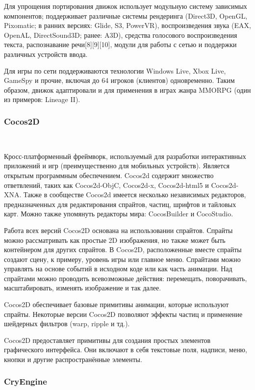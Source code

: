 Для упрощения портирования движок использует модульную систему зависимых компонентов; поддерживает различные системы рендеринга (Direct3D, OpenGL, Pixomatic; в ранних версиях: Glide, S3, PowerVR), воспроизведения звука (EAX, OpenAL, DirectSound3D; ранее: A3D), средства голосового воспроизведения текста, распознавание речи[8][9][10], модули для работы с сетью и поддержки различных устройств ввода.

Для игры по сети поддерживаются технологии Windows Live, Xbox Live, GameSpy и прочие, включая до 64 игроков (клиентов) одновременно. Таким образом, движок адаптировали и для применения в играх жанра MMORPG (один из примеров: Lineage II).

\subsubsection{Cocos2D}~
\label{sub:domain:subsec_game_engines:cocos}

Кросс-платформенный фреймворк, используемый для разработки интерактивных приложений и игр (преимущественно для мобильных устройств). Является открытым программным обеспечением. Cocos2d содержит множество ответвлений, таких как Cocos2d-ObjC, Cocos2d-x, Cocos2d-html5 и Cocos2d-XNA. Также в сообществе Cocos2d имеется несколько независимых редакторов, предназначенных для редактирования спрайтов, частиц, шрифтов и тайловых карт. Можно также упомянуть редакторы мира: CocosBuilder и CocoStudio.

Работа всех версий Cocos2D основана на использовании спрайтов. Спрайты можно рассматривать как простые 2D изображения, но также может быть контейнером для других спрайтов. В Cocos2D, расположенные вместе спрайты создают сцену, к примеру, уровень игры или главное меню. Спрайтами можно управлять на основе событий в исходном коде или как часть анимации. Над спрайтами можно проводить всевозможные действия: перемещать, поворачивать, масштабировать, изменять изображение и так далее.

Cocos2D обеспечивает базовые примитивы анимации, которые используют спрайты. Некоторые версии Cocos2D позволяют эффекты частиц и применение шейдерных фильтров (warp, ripple и тд.).

Cocos2D предоставляет примитивы для создания простых элементов графического интерфейса. Они включают в себя текстовые поля, надписи, меню, кнопки и другие распространённые элементы.

\subsubsection{CryEngine}~
\label{sub:domain:subsec_game_engines:cry}

